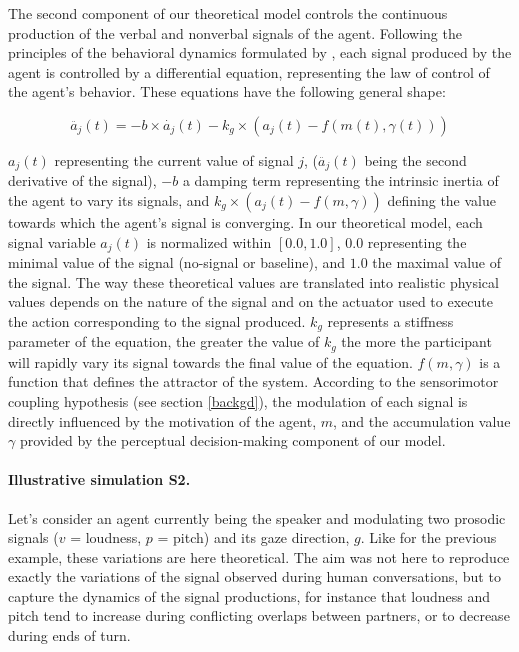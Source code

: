 The second component of our theoretical model controls the continuous production of the verbal and nonverbal signals of the agent.
Following the principles of the behavioral dynamics formulated by \citep{warren_dynamics_2006}, each signal produced by the agent is controlled by a differential equation, representing the law of control of the agent's behavior. These equations have the following general shape: 

\begin{equation}
  \ddot{a_j}(t)= -b\times\dot{a_j}(t) - k_g \times(a_j(t) - f(m(t),\gamma(t)))
  \label{signal_control}
\end{equation}

$a_j(t)$ representing the current value of signal $j$, ($\ddot{a_j}(t)$ being the second derivative of the signal), $-b$ a damping term representing the intrinsic inertia of the agent to vary its signals, and $k_g\times(a_j(t)-f(m,\gamma))$ defining the value towards which the agent's signal is converging. In our theoretical model, each signal variable $a_j(t)$ is normalized within $ [0.0,1.0] $, $0.0$ representing the minimal value of the signal (no-signal or baseline), and $1.0$ the maximal value of the signal. The way these theoretical values are translated into realistic physical values depends on the nature of the signal and on the actuator used to execute the action corresponding to the signal produced. 
$k_g$ represents a stiffness parameter of the equation, the greater the value of $k_g$ the more the participant will rapidly vary its signal towards the final value of the equation. 
$f(m,\gamma)$ is a function that defines the attractor of the system. According to the sensorimotor coupling hypothesis (see section \ref{backgd}), the modulation of each signal is directly influenced by the motivation of the agent, $m$, and the accumulation value $\gamma$ provided by the perceptual decision-making component of our model.

\paragraph{Illustrative simulation S2.} Let's consider an agent currently being the speaker and modulating two prosodic signals ($v$ = loudness, $p$ = pitch) and its gaze direction, $g$. 
Like for the previous example, these variations are here theoretical.
The aim was not here to reproduce exactly the variations of the signal observed during human conversations, but to capture the dynamics of the signal productions, for instance that loudness and pitch tend to increase %
during conflicting overlaps between partners, or to decrease during ends of turn. 

